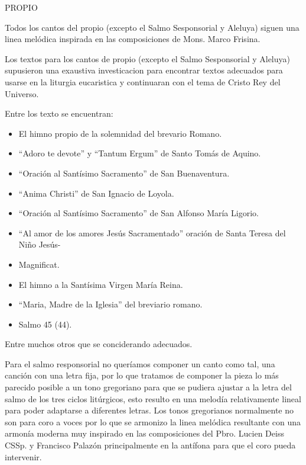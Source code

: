 \documentclass[12pt, letterpaper]{report}
\begin{document}
    \LARGE PROPIO

    \Large Todos los cantos del propio (excepto el Salmo Sesponsorial y Aleluya) siguen una linea mel\'odica inspirada en las composiciones de Mons. Marco Frisina.

    Los textos para los cantos de propio (excepto el Salmo Sesponsorial y Aleluya) supusieron una exaustiva investicacion para encontrar textos adecuados para usarse en la liturgia eucaristica y continuaran con el tema de Cristo Rey del Universo.
    \clearpage
    
    Entre los texto se encuentran: 

    \begin{itemize}
     \item El himno propio de la solemnidad del brevario Romano.
     \item ``Adoro te devote'' y ``Tantum Ergum'' de Santo Tom\'as de Aquino.
     \item ``Oraci\'on al Sant\'isimo Sacramento'' de San Buenaventura.
     \item ``Anima Christi'' de San Ignacio de Loyola.
     \item ``Oraci\'on al Sant\'isimo Sacramento'' de San Alfonso Mar\'ia Ligorio. 
     \item ``Al amor de los amores Jes\'us Sacramentado'' oraci\'on de Santa Teresa del Ni\~no Jes\'us-
     \item Magnificat.
     \item El himno a la Sant\'isima Virgen Mar\'ia Reina.
     \item ``Maria, Madre de la Iglesia'' del breviario romano.
     \item Salmo 45 (44).
    \end{itemize}

    Entre muchos otros que se conciderando adecuados.

    Para el salmo responsorial no quer\'iamos componer un canto como tal, una canci\'on con una letra fija, por lo que tratamos de componer la pieza lo m\'as parecido posible a un tono gregoriano para que se pudiera ajustar a la letra del salmo de
    los tres ciclos lit\'urgicos, esto resulto en una melod\'ia relativamente lineal para poder adaptarse a diferentes letras. Los tonos gregorianos normalmente no son para coro a voces por lo que se armonizo la linea mel\'odica resultante con una armon\'ia moderna muy inspirado en las composiciones del Pbro. Lucien Deiss CSSp. y Francisco Palaz\'on principalmente en la ant\'ifona para que el coro pueda intervenir.
\end{document}
